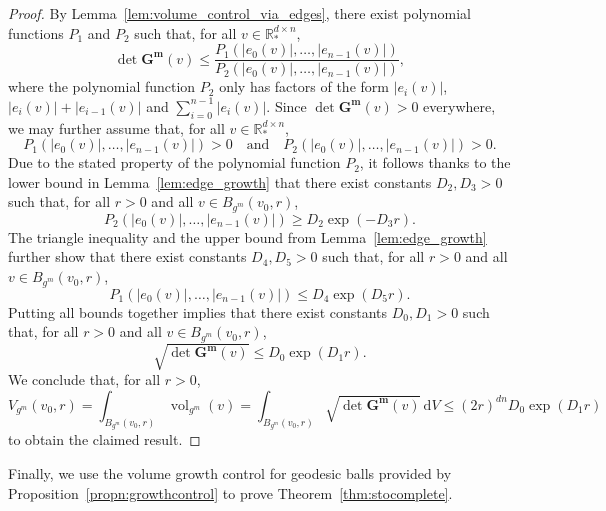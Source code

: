 \documentclass[11pt]{article}
\newcommand{\R}{\mathbb{R}}
\newcommand{\vol}{\operatorname{vol}}
\newcommand{\dd}{\,{\mathrm d}}
\begin{document}
\begin{proof}
    By Lemma~\ref{lem:volume_control_via_edges}, there exist polynomial functions $P_1$ and $P_2$ such that, for all $v\in\R^{d\times n}_*$,
    \begin{displaymath}
        \det\mathbf{G^m}(v)
        \leq\frac{P_1(|e_0(v)|,\dots,|e_{n-1}(v)|)}{P_2(|e_0(v)|,\dots,|e_{n-1}(v)|)},
    \end{displaymath}
    where the polynomial function $P_2$ only has factors of the form $|e_i(v)|$, $|e_i(v)|+|e_{i-1}(v)|$ and $\sum_{i=0}^{n-1}|e_i(v)|$. Since $\det\mathbf{G^m}(v)>0$ everywhere, we may further assume that, for all $v\in\R^{d\times n}_*$,
    \begin{displaymath}
        P_1(|e_0(v)|,\dots,|e_{n-1}(v)|)>0
        \quad\text{and}\quad
        P_2(|e_0(v)|,\dots,|e_{n-1}(v)|)>0.
    \end{displaymath}
    Due to the stated property of the polynomial function $P_2$, it follows thanks to the lower bound in Lemma~\ref{lem:edge_growth} that there exist constants $D_2,D_3>0$ such that, for all $r>0$ and all $v\in B_{g^m}(v_0,r)$,
    \begin{displaymath}
        P_2(|e_0(v)|,\dots,|e_{n-1}(v)|)\geq D_2\exp\left(-D_3 r\right).
    \end{displaymath}
    The triangle inequality and the upper bound from Lemma~\ref{lem:edge_growth} further show that there exist constants $D_4,D_5>0$ such that, for all $r>0$ and all $v\in B_{g^m}(v_0,r)$,
    \begin{displaymath}
        P_1(|e_0(v)|,\dots,|e_{n-1}(v)|)\leq D_4\exp\left(D_5 r\right).
    \end{displaymath}
    Putting all bounds together implies that there exist constants $D_0,D_1>0$ such that, for all $r>0$ and all $v\in B_{g^m}(v_0,r)$,
    \begin{displaymath}
        \sqrt{\det\mathbf{G^m}(v)}\leq D_0\exp\left(D_1 r\right).
    \end{displaymath}
    We conclude that, for all $r>0$,
    \begin{displaymath}
        V_{g^m}(v_0,r)
        =\int_{B_{g^m}(v_0,r)}\vol_{g^m}(v)
        =\int_{B_{g^m}(v_0,r)}\sqrt{\det\mathbf{G^m}(v)}\dd V
        \leq \left(2r\right)^{dn}D_0\exp\left(D_1 r\right)
    \end{displaymath}
    to obtain the claimed result.
\end{proof}

Finally, we use the volume growth control for geodesic balls provided by Proposition~\ref{propn:growthcontrol} to prove Theorem~\ref{thm:stocomplete}.
\end{document}
